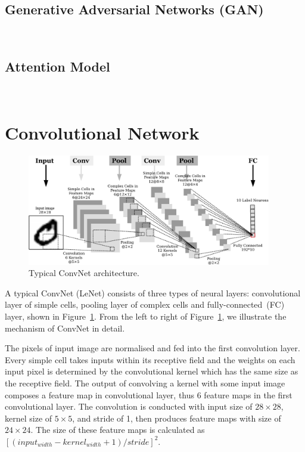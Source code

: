 \subsection{Generative Adversarial Networks (GAN)}~\cite{goodfellow2014generative}


\subsection{Attention Model}~\cite{bahdanau2014neural}



\section{Convolutional Network}
	\begin{figure}[bt]
		\centering
		\includegraphics[width=0.95\textwidth]{pics_snn/convnet.pdf}
		\caption{Typical ConvNet architecture.}
		\label{Fig:ConvNet}
	\end{figure}

A typical ConvNet (LeNet) consists of three types of neural layers: convolutional layer of simple cells, pooling layer of complex cells and fully-connected~(FC) layer, shown in Figure~\ref{Fig:ConvNet}.
From the left to right of Figure~\ref{Fig:ConvNet}, we illustrate the mechanism of ConvNet in detail.

The pixels of input image are normalised and fed into the first convolution layer.
Every simple cell takes inputs within its receptive field and the weights on each input pixel is determined by the convolutional kernel which has the same size as the receptive field.
The output of convolving a kernel with some input image composes a feature map in convolutional layer, thus 6 feature maps in the first convolutional layer.
The convolution is conducted with input size of $28\times28$, kernel size of $5\times5$, and stride of 1, then produces feature maps with size of $24\times24$.
The size of these feature maps is calculated as $[(input_{width}- kernel_{width}+1)/stride]^2$.

